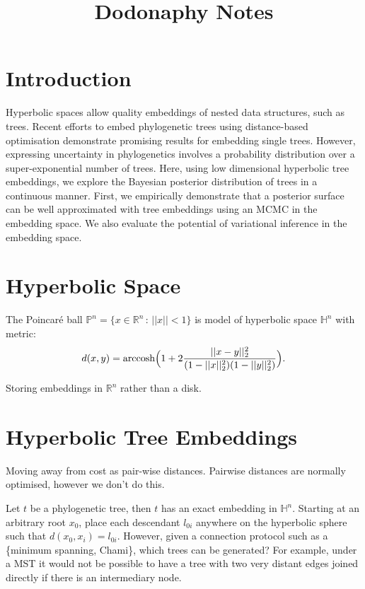 \documentclass[11pt]{article}
\title{Dodonaphy Notes}
\begin{document}
\maketitle
\section{Introduction}
Hyperbolic spaces allow quality embeddings of nested data structures, such as trees.
Recent efforts to embed phylogenetic trees using distance-based optimisation demonstrate promising results for embedding single trees.
However, expressing uncertainty in phylogenetics involves a probability distribution over a super-exponential number of trees.
Here, using low dimensional hyperbolic tree embeddings, we explore the Bayesian posterior distribution of trees in a continuous manner.
First, we empirically demonstrate that a posterior surface can be well approximated with tree embeddings using an MCMC in the embedding space.
We also evaluate the potential of variational inference in the embedding space.

\section{Hyperbolic Space}
The Poincaré ball $\mathbb{P}^{n} = \{x\in \mathbb{R}^{n} \,:\, ||x||<1\}$ is model of hyperbolic space $\mathbb{H}^{n}$ with metric:
\begin{equation*}
d(x,y) = \textnormal{arccosh}\Big(1 + 2 \frac{||x-y||_{2}^{2}}{ (1-||x||_{2}^{2}) (1-||y||_{2}^{2})}\Big).
\end{equation*}

Storing embeddings in $\mathbb{R}^{n}$ rather than a disk.

\section{Hyperbolic Tree Embeddings}
Moving away from cost as pair-wise distances.
Pairwise distances are normally optimised, however we don't do this.


Let $t$ be a phylogenetic tree, then $t$ has an exact embedding in $\mathbb{H}^{n}$. Starting at an arbitrary root $x_{0}$, place each descendant $l_{0i}$ anywhere on the hyperbolic sphere such that $d(x_{0}, x_{i}) = l_{0i}$. However, given a connection protocol such as a \{minimum spanning, Chami\}, which trees can be generated? For example, under a MST it would not be possible to have a tree with two very distant edges joined directly if there is an intermediary node. 
\end{document}
